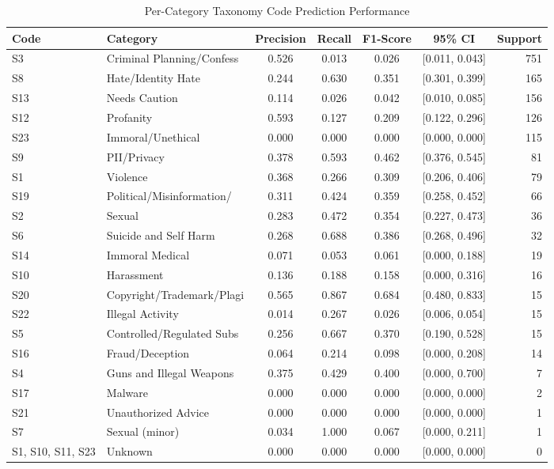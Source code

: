 \begin{table}[h]
\centering
\caption{Per-Category Taxonomy Code Prediction Performance}
\label{tab:taxonomy}
\begin{tabular}{llccccr}
\hline
Code & Category & Precision & Recall & F1-Score & 95\% CI & Support \\
\hline
S3 & Criminal Planning/Confess & 0.526 & 0.013 & 0.026 & [0.011, 0.043] & 751 \\
S8 & Hate/Identity Hate & 0.244 & 0.630 & 0.351 & [0.301, 0.399] & 165 \\
S13 & Needs Caution & 0.114 & 0.026 & 0.042 & [0.010, 0.085] & 156 \\
S12 & Profanity & 0.593 & 0.127 & 0.209 & [0.122, 0.296] & 126 \\
S23 & Immoral/Unethical & 0.000 & 0.000 & 0.000 & [0.000, 0.000] & 115 \\
S9 & PII/Privacy & 0.378 & 0.593 & 0.462 & [0.376, 0.545] & 81 \\
S1 & Violence & 0.368 & 0.266 & 0.309 & [0.206, 0.406] & 79 \\
S19 & Political/Misinformation/ & 0.311 & 0.424 & 0.359 & [0.258, 0.452] & 66 \\
S2 & Sexual & 0.283 & 0.472 & 0.354 & [0.227, 0.473] & 36 \\
S6 & Suicide and Self Harm & 0.268 & 0.688 & 0.386 & [0.268, 0.496] & 32 \\
S14 & Immoral Medical & 0.071 & 0.053 & 0.061 & [0.000, 0.188] & 19 \\
S10 & Harassment & 0.136 & 0.188 & 0.158 & [0.000, 0.316] & 16 \\
S20 & Copyright/Trademark/Plagi & 0.565 & 0.867 & 0.684 & [0.480, 0.833] & 15 \\
S22 & Illegal Activity & 0.014 & 0.267 & 0.026 & [0.006, 0.054] & 15 \\
S5 & Controlled/Regulated Subs & 0.256 & 0.667 & 0.370 & [0.190, 0.528] & 15 \\
S16 & Fraud/Deception & 0.064 & 0.214 & 0.098 & [0.000, 0.208] & 14 \\
S4 & Guns and Illegal Weapons & 0.375 & 0.429 & 0.400 & [0.000, 0.700] & 7 \\
S17 & Malware & 0.000 & 0.000 & 0.000 & [0.000, 0.000] & 2 \\
S21 & Unauthorized Advice & 0.000 & 0.000 & 0.000 & [0.000, 0.000] & 1 \\
S7 & Sexual (minor) & 0.034 & 1.000 & 0.067 & [0.000, 0.211] & 1 \\
S1, S10, S11, S23 & Unknown & 0.000 & 0.000 & 0.000 & [0.000, 0.000] & 0 \\

\end{tabular}
\end{table}
